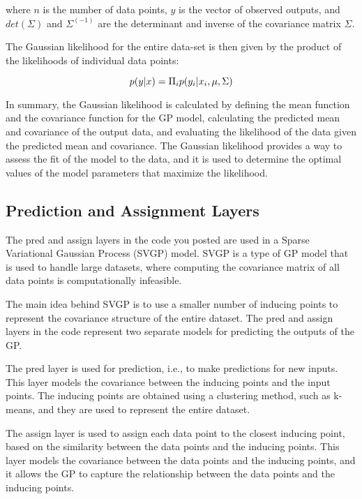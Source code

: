 \documentclass[12pt,a4paper]{report}
\begin{document}
where $n$ is the number of data points, $y$ is the vector of observed outputs, and $det(\Sigma)$ and $\Sigma^(-1)$ are the determinant and inverse of the covariance matrix $\Sigma$.

The Gaussian likelihood for the entire data-set is then given by the product of the likelihoods of individual data points:

\begin{equation}
    \centering
    p(y|x) = \Pi_i p(y_i|x_i, \mu, \Sigma) 
\end{equation}

In summary, the Gaussian likelihood is calculated by defining the mean function and the covariance function for the GP model, calculating the predicted mean and covariance of the output data, and evaluating the likelihood of the data given the predicted mean and covariance. The Gaussian likelihood provides a way to assess the fit of the model to the data, and it is used to determine the optimal values of the model parameters that maximize the likelihood.

\subsection{Prediction and Assignment Layers}

The pred and assign layers in the code you posted are used in a Sparse Variational Gaussian Process (SVGP) model. SVGP is a type of GP model that is used to handle large datasets, where computing the covariance matrix of all data points is computationally infeasible.

The main idea behind SVGP is to use a smaller number of inducing points to represent the covariance structure of the entire dataset. The pred and assign layers in the code represent two separate models for predicting the outputs of the GP.

The pred layer is used for prediction, i.e., to make predictions for new inputs. This layer models the covariance between the inducing points and the input points. The inducing points are obtained using a clustering method, such as k-means, and they are used to represent the entire dataset.

The assign layer is used to assign each data point to the closest inducing point, based on the similarity between the data points and the inducing points. This layer models the covariance between the data points and the inducing points, and it allows the GP to capture the relationship between the data points and the inducing points.
\end{document}
